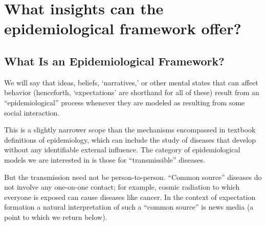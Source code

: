 

\section{What insights can the epidemiological framework
  offer?}\label{what-insights-can-the-epidemiological-framework-offer}

\subsection{What Is an Epidemiological Framework?}
\label{subsec:epi_framework}

We will say that ideas, beliefs, `narratives,' or other mental states that can affect behavior (henceforth, `expectations' are shorthand for all of these) result from an ``epidemiological'' process whenever they are modeled as resulting from some social interaction.

This is a slightly narrower scope than the mechanisms encompassed in textbook
definitions of epidemiology, which can include the study of diseases that develop without any identifiable external influence.  The category of epidemiological models we are interested in is those for ``transmissible'' diseases.

But the transmission need not be person-to-person.   ``Common source''  diseases do not involve any one-on-one contact; for example, cosmic radiation to which everyone is exposed can cause diseases like cancer.  %
In the context of expectation formation a natural interpretation of such a ``common source'' is news media (a point to which we return below).

